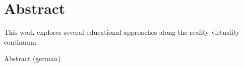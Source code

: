 %
\chapter*{Abstract}
\label{sec:abstract}
\vspace*{-10mm}

This work explores several educational approaches along the reality-virtuality continuum.

\vspace*{20mm}

{Abstract (german)}\label{sec:abstract-diff} \\

\blindtext
